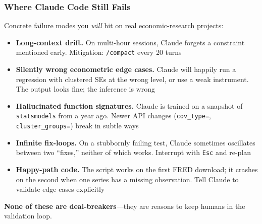 \documentclass[10pt,english,aspectratio=169]{beamer}
\begin{document}
\begin{frame}
\frametitle{Where Claude Code Still Fails}

Concrete failure modes you \textit{will} hit on real economic-research projects:

\vspace{0.2cm}

\begin{itemize}
    \item \textbf{Long-context drift.} On multi-hour sessions, Claude forgets a constraint mentioned early. Mitigation: \texttt{/compact} every 20 turns
    \vspace{0.05cm}
    \item \textbf{Silently wrong econometric edge cases.} Claude will happily run a regression with clustered SEs at the wrong level, or use a weak instrument. The output looks fine; the inference is wrong
    \vspace{0.05cm}
    \item \textbf{Hallucinated function signatures.} Claude is trained on a snapshot of \texttt{statsmodels} from a year ago. Newer API changes (\texttt{cov\_type=}, \texttt{cluster\_groups=}) break in subtle ways
    \vspace{0.05cm}
    \item \textbf{Infinite fix-loops.} On a stubbornly failing test, Claude sometimes oscillates between two ``fixes,'' neither of which works. Interrupt with \texttt{Esc} and re-plan
    \vspace{0.05cm}
    \item \textbf{Happy-path code.} The script works on the first FRED download; it crashes on the second when one series has a missing observation. Tell Claude to validate edge cases explicitly
\end{itemize}

\vspace{0.2cm}

\textbf{None of these are deal-breakers}---they are reasons to keep humans in the validation loop.
\end{frame}
\end{document}
